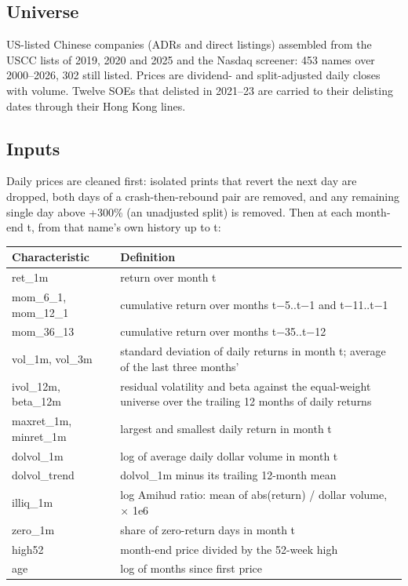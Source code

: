 \documentclass[
  10pt,
  a4paper,
]{article}
\newcounter{none} %
\begin{document}
\subsection{Universe}\label{universe}

US-listed Chinese companies (ADRs and direct listings)
assembled from the USCC lists of 2019, 2020 and 2025 and the
Nasdaq screener: 453 names over 2000--2026, 302 still
listed. Prices are dividend- and split-adjusted daily closes
with volume. Twelve SOEs that delisted in 2021--23 are
carried to their delisting dates through their Hong Kong
lines.

\subsection{Inputs}\label{inputs}

Daily prices are cleaned first: isolated prints that revert
the next day are dropped, both days of a crash-then-rebound
pair are removed, and any remaining single day above +300\%
(an unadjusted split) is removed. Then at each month-end t,
from that name's own history up to t:

{\def\LTcaptype{none} %
\begin{longtable}[]{@{}
  >{\raggedright\arraybackslash}p{}
  >{\raggedright\arraybackslash}p{}@{}}
\toprule\noalign{}
\begin{minipage}[b]{\linewidth}\raggedright
Characteristic
\end{minipage} & \begin{minipage}[b]{\linewidth}\raggedright
Definition
\end{minipage} \\
\midrule\noalign{}
\endhead
\bottomrule\noalign{}
\endlastfoot
ret\_1m & return over month t \\
mom\_6\_1, mom\_12\_1 & cumulative return over months
t−5..t−1 and t−11..t−1 \\
mom\_36\_13 & cumulative return over months t−35..t−12 \\
vol\_1m, vol\_3m & standard deviation of daily returns in
month t; average of the last three months' \\
ivol\_12m, beta\_12m & residual volatility and beta against
the equal-weight universe over the trailing 12 months of
daily returns \\
maxret\_1m, minret\_1m & largest and smallest daily return
in month t \\
dolvol\_1m & log of average daily dollar volume in month
t \\
dolvol\_trend & dolvol\_1m minus its trailing 12-month
mean \\
illiq\_1m & log Amihud ratio: mean of abs(return) / dollar
volume, \(\times\) 1e6 \\
zero\_1m & share of zero-return days in month t \\
high52 & month-end price divided by the 52-week high \\
age & log of months since first price \\
\end{longtable}
}
\end{document}
